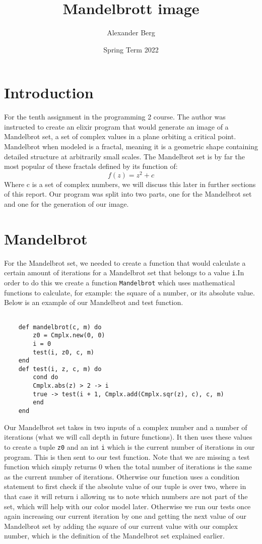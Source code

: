 \documentclass[a4paper,11pt]{article}
\begin{document}
\title{
    \textbf{Mandelbrott image}
}
\author{Alexander Berg}
\date{Spring Term 2022}

\maketitle

\section*{Introduction}

For the tenth assignment in the programming 2 course. The author was instructed to create an elixir program that would generate an image of a Mandelbrot set, a set of complex values in a plane orbiting a critical point. Mandelbrot when modeled is a fractal, meaning it is a geometric shape containing detailed structure at arbitrarily small scales. The Mandelbrot set is by far the most popular of these fractals defined by its function of: \[f(z)=z^2 + c\] Where c is a set of complex numbers, we will discuss this later in further sections of this report. Our program was split into two parts, one for the Mandelbrot set and one for the generation of our image.

\section*{Mandelbrot}

For the Mandelbrot set, we needed to create a function that would calculate a certain amount of iterations for a Mandelbrot set that belongs to a value {\tt i}.In order to do this we create a function {\tt Mandelbrot} which uses mathematical functions to calculate, for example: the square of a number, or its absolute value. Below is an example of our Mandelbrot and test function.

\begin{verbatim}

    def mandelbrot(c, m) do
        z0 = Cmplx.new(0, 0)
        i = 0
        test(i, z0, c, m)
    end
    def test(i, z, c, m) do
        cond do
        Cmplx.abs(z) > 2 -> i
        true -> test(i + 1, Cmplx.add(Cmplx.sqr(z), c), c, m)
        end
    end
\end{verbatim}

Our Mandelbrot set takes in two inputs of a complex number and a number of iterations (what we will call depth in future functions). It then uses these values to create a tuple {\tt z0} and an int {\tt i} which is the current number of iterations in our program. This is then sent to our test function. Note that we are missing a test function which simply returns 0 when the total number of iterations is the same as the current number of iterations. Otherwise our function uses a condition statement to first check if the absolute value of our tuple is over two, where in that case it will return i allowing us to note which numbers are not part of the set, which will help with our color model later. Otherwise we run our tests once again increasing our current iteration by one and getting the next value of our Mandelbrot set by adding the square of our current value with our complex number, which is the definition of the Mandelbrot set explained earlier.
\end{document}
